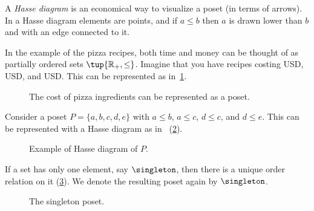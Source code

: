 \noindent A \emph{Hasse diagram} is an economical way to visualize a poset (in terms of arrows). In a Hasse diagram elements are points, and if $a \leq b$ then $a$ is drawn lower than $b$ and with an edge connected to it.

\noindent In the example of the pizza recipes, both time and money can be thought of as partially ordered sets $\tup{\mathbb{R}_+,\leq}$. Imagine that you have recipes costing \unit[1]{USD}, \unit[2]{USD}, and \unit[3]{USD}. This can be represented as in~\cref{fig:hassepizza}.

\begin{figure}[h!]
    \begin{center}
    \caption{The cost of pizza ingredients can be represented as a poset.\label{fig:hassepizza}}
    \end{center}
\end{figure}


\begin{example}
Consider a poset $P=\{a,b,c,d,e\}$ with $a\leq b$, $a\leq c$, $d\leq c$, and $d\leq e$. This can be represented with a Hasse diagram as in ~(\cref{fig:hasse}).
\end{example}

\begin{figure}[h!]
   \centering
   \caption{Example of Hasse diagram of $P$. \label{fig:hasse}}
\end{figure}


\begin{example}\label{ex:singleton}
If a set has only one element, say $\singleton$, then there is a unique order relation on it (\cref{fig:singleton}). We denote the resulting poset again by $\singleton$.
\end{example}
\begin{figure}[h!]
   \centering
   \caption{The singleton poset.\label{fig:singleton}}
\end{figure}

